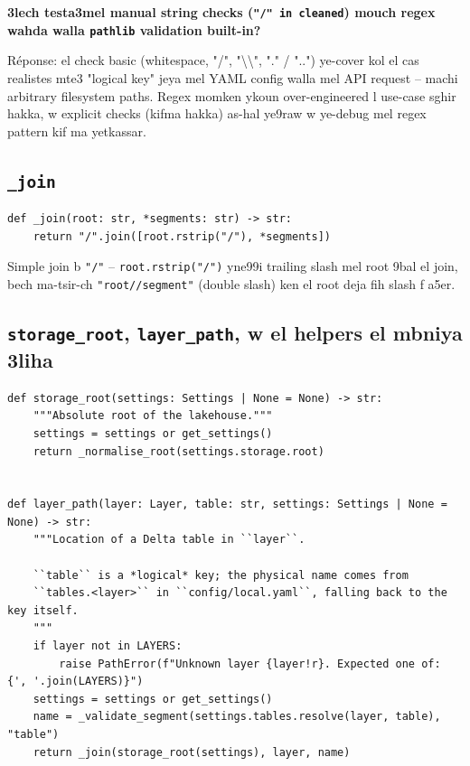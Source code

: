 \documentclass[11pt,a4paper]{report}
\DeclareRobustCommand{\code}[1]{\texttt{#1}}
\begin{document}
\begin{soual}
\textbf{3lech testa3mel manual string checks (\code{"/" in cleaned}) mouch
regex wahda walla \code{pathlib} validation built-in?}

Réponse: el check basic (whitespace, "/", "\textbackslash{}\textbackslash{}",
"." / "..") ye-cover kol el cas realistes mte3 "logical key" jeya mel YAML
config walla mel API request -- machi arbitrary filesystem paths. Regex
momken ykoun over-engineered l use-case sghir hakka, w explicit checks
(kifma hakka) as-hal ye9raw w ye-debug mel regex pattern kif ma yetkassar.
\end{soual}

\subsection{\code{\_join}}

\begin{lstlisting}[style=pystyle]
def _join(root: str, *segments: str) -> str:
    return "/".join([root.rstrip("/"), *segments])
\end{lstlisting}

Simple join b \code{"/"} -- \code{root.rstrip("/")} yne99i trailing slash mel
root 9bal el join, bech ma-tsir-ch \code{"root//segment"} (double slash) ken
el root deja fih slash f a5er.

\subsection{\code{storage\_root}, \code{layer\_path}, w el helpers el mbniya 3liha}

\begin{lstlisting}[style=pystyle]
def storage_root(settings: Settings | None = None) -> str:
    """Absolute root of the lakehouse."""
    settings = settings or get_settings()
    return _normalise_root(settings.storage.root)


def layer_path(layer: Layer, table: str, settings: Settings | None = None) -> str:
    """Location of a Delta table in ``layer``.

    ``table`` is a *logical* key; the physical name comes from
    ``tables.<layer>`` in ``config/local.yaml``, falling back to the key itself.
    """
    if layer not in LAYERS:
        raise PathError(f"Unknown layer {layer!r}. Expected one of: {', '.join(LAYERS)}")
    settings = settings or get_settings()
    name = _validate_segment(settings.tables.resolve(layer, table), "table")
    return _join(storage_root(settings), layer, name)
\end{lstlisting}
\end{document}
